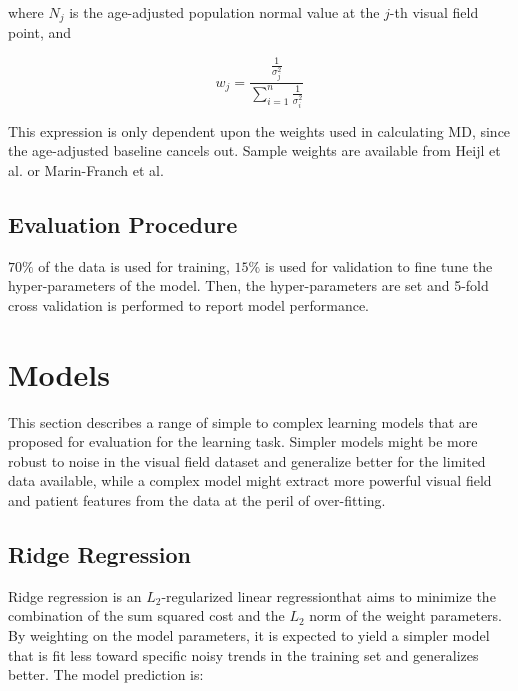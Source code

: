 where $N_j$ is the age-adjusted population normal value at the $j$-th visual field point, and 

\begin{equation}
w_j=\frac{ \frac{1}{\sigma_{j}^2} }{
	\sum\limits_{i=1}^{n} 
	\frac{1}{\sigma_{i}^2} 
}
\end{equation}

This expression is only dependent upon the weights used in calculating \ac{MD}, since the age-adjusted baseline cancels out. Sample weights are available from Heijl et al. \cite{Heijl1987} or Marin-Franch et al. \cite{Marin-Franch2013}

\subsection{Evaluation Procedure}

$70\%$ of the data is used for training, $15\%$ is used for validation to fine tune the hyper-parameters of the model. Then, the hyper-parameters are set and 5-fold cross validation is performed to report model performance. 

\section{Models}

This section describes a range of simple to complex learning models that are proposed for evaluation for the learning task. Simpler models might be more robust to noise in the visual field dataset and generalize better for the limited data available, while a complex model might extract more powerful visual field and patient features from the data at the peril of over-fitting. 

\subsection{Ridge Regression}

Ridge regression is an $L_2$-regularized linear regression\footnotemark that aims to minimize the combination of the sum squared cost and the $L_2$ norm of the weight parameters. By weighting on the model parameters, it is expected to yield a simpler model that is fit less toward specific noisy trends in the training set and generalizes better. The model prediction is: 


